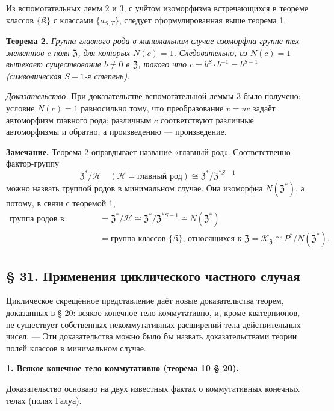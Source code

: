 \documentclass[11pt]{article}
\begin{document}
Из вспомогательных лемм 2 и 3, с учётом изоморфизма встречающихся в теореме классов \(\{\mathfrak K\}\) с классами \(\{a_{S,T}\}\), следует сформулированная выше теорема 1.

\noindent\textbf{Теорема 2.} \emph{Группа главного рода в минимальном случае изоморфна группе тех элементов \(c\) поля \(\mathfrak Z\), для которых \(N(c)=1\). Следовательно, из \(N(c)=1\) вытекает существование \(b\neq0\) в \(\mathfrak Z\), такого что \(c=b^S\cdot b^{-1}=b^{S-1}\) (символическая \(S-1\)-я степень).}

\noindent\emph{Доказательство.} При доказательстве вспомогательной леммы 3 было получено: условие \(N(c)=1\) равносильно тому, что преобразование \(v=uc\) задаёт автоморфизм главного рода; различным \(c\) соответствуют различные автоморфизмы и обратно, а произведению --- произведение.

\noindent\textbf{Замечание.} Теорема 2 оправдывает название «главный род». Соответственно фактор-группу
\[
\mathfrak Z^*/\mathscr H
\quad(\mathscr H=\text{главный род})
\cong\mathfrak Z^*/\mathfrak Z^{*S-1}
\]
можно назвать группой родов в минимальном случае. Она изоморфна \(N(\mathfrak Z^*)\), а потому, в связи с теоремой 1,
\[
\begin{aligned}
\text{группа родов в минимальном случае}
&=\mathfrak Z^*/\mathscr H
 \cong\mathfrak Z^*/\mathfrak Z^{*S-1}
 \cong N(\mathfrak Z^*)\\
&=\text{группа классов }\{\mathfrak K\}\text{, относящихся к }\mathfrak Z
 =\mathscr K_{\mathfrak Z}
 \cong P^*/N(\mathfrak Z^*).
\end{aligned}
\]

\subsection*{§ 31. Применения циклического частного случая}\label{anwendungen-des-zyklischen-spezialfalles}

Циклическое скрещённое представление даёт новые доказательства теорем, доказанных в § 20: всякое конечное тело коммутативно, и, кроме кватернионов, не существует собственных некоммутативных расширений тела действительных чисел. --- Эти доказательства можно было бы назвать доказательствами теории полей классов в минимальном случае.

\noindent\textbf{1. Всякое конечное тело коммутативно (теорема 10 § 20).}

Доказательство основано на двух известных фактах о коммутативных конечных телах (полях Галуа).
\end{document}
